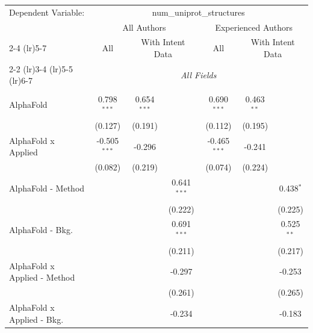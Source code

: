 \begingroup
\centering
\begin{tabular}{lcccccc}
   \tabularnewline \midrule \midrule
   Dependent Variable: & \multicolumn{6}{c}{num\_uniprot\_structures}\\
 & \multicolumn{3}{c}{All Authors} & \multicolumn{3}{c}{Experienced Authors} \\
\cmidrule(lr){2-4} \cmidrule(lr){5-7}
 & \multicolumn{1}{c}{All} & \multicolumn{2}{c}{With Intent Data} & \multicolumn{1}{c}{All} & \multicolumn{2}{c}{With Intent Data} \\
\cmidrule(lr){2-2} \cmidrule(lr){3-4} \cmidrule(lr){5-5} \cmidrule(lr){6-7}
 & \multicolumn{6}{c}{\textit{All Fields}} \\ \\
   AlphaFold                      & 0.798$^{***}$  & 0.654$^{***}$ &               & 0.690$^{***}$  & 0.463$^{**}$ &   \\   
                                  & (0.127)        & (0.191)       &               & (0.112)        & (0.195)      &   \\   
   AlphaFold x Applied            & -0.505$^{***}$ & -0.296        &               & -0.465$^{***}$ & -0.241       &   \\   
                                  & (0.082)        & (0.219)       &               & (0.074)        & (0.224)      &   \\   
   AlphaFold - Method             &                &               & 0.641$^{***}$ &                &              & 0.438$^{*}$\\   
                                  &                &               & (0.222)       &                &              & (0.225)\\   
   AlphaFold - Bkg.               &                &               & 0.691$^{***}$ &                &              & 0.525$^{**}$\\   
                                  &                &               & (0.211)       &                &              & (0.217)\\   
   AlphaFold x Applied - Method   &                &               & -0.297        &                &              & -0.253\\   
                                  &                &               & (0.261)       &                &              & (0.265)\\   
   AlphaFold x Applied - Bkg.     &                &               & -0.234        &                &              & -0.183\\   

\end{tabular}
